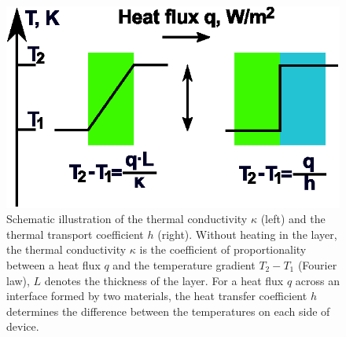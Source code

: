 \documentclass[%
9pt,
 aip,
rsi,%
 amsmath,amssymb,
preprint,%
]{revtex4-1}
\begin{document}
\begin{figure}
    \centering	
    \includegraphics{new_bc.eps}
    \caption{ Schematic illustration of the thermal conductivity $\kappa$ (left) and the thermal transport coefficient $h$ (right). Without heating in the layer, the thermal conductivity $\kappa$ is the coefficient of proportionality between a heat flux $q$ and the temperature gradient $T_2 - T_1$ (Fourier law), $L$ denotes the thickness of the layer. For a heat flux $q$ across an interface formed by two materials, the heat transfer coefficient $h$ determines the difference between the temperatures on each side of device.}
    \label{fig:bcpic}
\end{figure}
\end{document}
